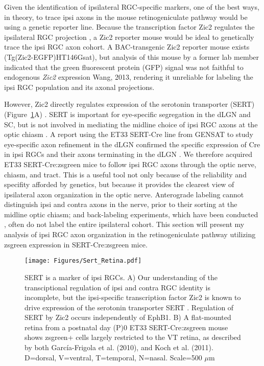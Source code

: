 Given the identification of ipsilateral RGC-specific markers, one of the best ways, in theory, to trace ipsi axons in the mouse retinogeniculate pathway would be using a genetic reporter line.
Because the transcription factor Zic2 regulates the ipsilateral RGC projection \cite{herrera2003zic2,williams2003ephrin}, a Zic2 reporter mouse would be ideal to genetically trace the ipsi RGC axon cohort.
A BAC-transgenic Zic2 reporter mouse exists (Tg(Zic2-EGFP)HT146Gsat), but analysis of this mouse by a former lab member indicated that the green fluorescent protein (GFP) signal was not faithful to endogenous \emph{Zic2} expression {Wang, 2013}, rendering it unreliable for labeling the ipsi RGC population and its axonal projections.

However, Zic2 directly regulates expression of the serotonin transporter (SERT) (Figure~\ref{Figures/Sert_Retina}A) \cite{garcia2010zic2}.
SERT is important for eye-specific segregation in the dLGN and SC, but is not involved in mediating the midline choice of ipsi RGC axons at the optic chiasm \cite{salichon2001excessive,upton1999excess,garcia2010zic2}.
A report using the ET33 SERT-Cre line from GENSAT to study eye-specific axon refinement in the dLGN confirmed the specific expression of Cre in ipsi RGCs and their axons terminating in the dLGN \cite{koch2011pathway}.
We therefore acquired ET33 SERT-Cre:zsgreen mice to follow ipsi RGC axons through the optic nerve, chiasm, and tract.
This is a useful tool not only because of the reliability and specifity afforded by genetics, but because it provides the clearest view of ipsilateral axon organization in the optic nerve.
Anterograde labeling cannot distinguish ipsi and contra axons in the nerve, prior to their sorting at the midline optic chiasm; and back-labeling experiments, which have been conducted \cite{colello1990early}, often do not label the entire ipsilateral cohort.
This section will present my analysis of ipsi RGC axon organization in the retinogeniculate pathway utilizing zsgreen expression in SERT-Cre:zsgreen mice.

\begin{figure}[hbtp]
	\begin{center}
		\texttt{[image: Figures/Sert\_Retina.pdf]}
		\caption[SERT is a marker of ipsi RGCs.]
		{
		SERT is a marker of ipsi RGCs. 
		A) Our understanding of the transciptional regulation of ipsi and contra RGC identity is incomplete, but the ipsi-specific transcription factor Zic2 is known to drive expression of the serotonin transporter SERT \cite{garcia2010zic2}.
		Regulation of SERT by Zic2 occurs independently of EphB1.
		B) A flat-mounted retina from a postnatal day (P)0 ET33 SERT-Cre:zsgreen mouse shows zsgreen+ cells largely restricted to the VT retina, as described by both Garc\'ia-Frigola et al. (2010), and Koch et al. (2011). 
		D=dorsal, V=ventral, T=temporal, N=nasal. 
		Scale=500 $\mu$m
		}
		\label{Figures/Sert_Retina}
	\end{center}
\end{figure}

